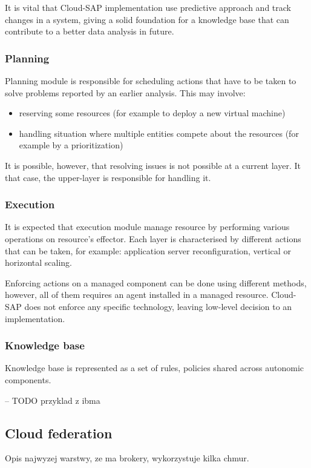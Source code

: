 It is vital that Cloud-SAP implementation use predictive approach \cite{JiPeLiCh11} and track changes \cite{ZhYaWo05} in a system, giving a solid foundation for a knowledge base that can contribute to a better data analysis in future.

\subsubsection{Planning}
Planning module is responsible for scheduling actions that have to be taken to solve problems reported by an earlier analysis. This may involve:
\begin{itemize}
 \item reserving some resources (for example to deploy a new virtual machine)
 \item handling situation where multiple entities compete about the resources (for example by a prioritization)
\end{itemize}

It is possible, however, that resolving issues is not possible at a current layer. It that case, the upper-layer is responsible for handling it.

\subsubsection{Execution}
It is expected that execution module manage resource by performing various operations on resource's effector. Each layer is characterised by different actions that can be taken, for example: application server reconfiguration, vertical or horizontal scaling. 

Enforcing actions on a managed component can be done using different methods, however, all of them requires an agent installed in a managed resource. Cloud-SAP does not enforce any specific technology, leaving low-level decision to an implementation.

\subsubsection{Knowledge base}
Knowledge base is represented as a set of rules, policies shared across autonomic components.

-- TODO przyklad z ibma

\subsection{Cloud federation}
Opis najwyzej warstwy, ze ma brokery, wykorzystuje kilka chmur.


